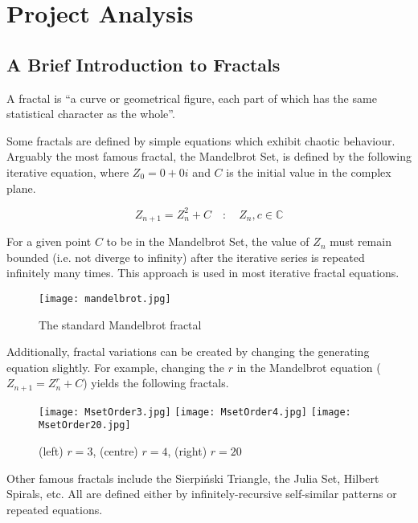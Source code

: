 \section{Project Analysis} \label{analysis}

\subsection{A Brief Introduction to Fractals}

A fractal is ``a curve or geometrical figure, each part of which has the same statistical character as the whole''\cite{soanes_hawker_2013}.

Some fractals are defined by simple equations which exhibit chaotic behaviour. Arguably the most famous fractal, the Mandelbrot Set, is defined by the following iterative equation, where \(Z_0=0+0i\) and \(C\) is the initial value in the complex plane.

\begin{equation}
	Z_{n+1} = Z_n^2 + C \quad:\quad Z_n, c \in \mathbb{C}		
\end{equation}

For a given point \(C\) to be in the Mandelbrot Set, the value of \(Z_n\) must remain bounded (i.e. not diverge to infinity) after the iterative series is repeated infinitely many times. This approach is used in most iterative fractal equations.

\vspace{0.5cm}

\begin{figure}[h]
    \centering
	\texttt{[image: mandelbrot.jpg]}
	\caption{The standard Mandelbrot fractal\cite{bourke_2002}}
\end{figure}

Additionally, fractal variations can be created by changing the generating equation slightly. For example, changing the \(r\) in the Mandelbrot equation (\(Z_{n+1}=Z_n^r+C\)) yields the following fractals.

\begin{figure} [htp]
	\centering
	\texttt{[image: MsetOrder3.jpg]}\hfill
	\texttt{[image: MsetOrder4.jpg]}\hfill
	\texttt{[image: MsetOrder20.jpg]}
	
	\caption{(left) \(r=3\), (centre) \(r=4\), (right) \(r=20\)}
\end{figure}

Other famous fractals include the Sierpiński Triangle, the Julia Set, Hilbert Spirals, etc. All are defined either by infinitely-recursive self-similar patterns or repeated equations.

